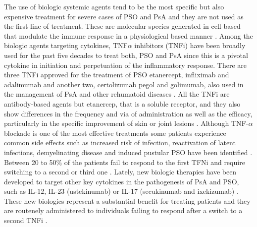 The use of biologic systemic agents tend to be the most specific but also expensive treatment for severe cases of PSO and PsA and they are not used as the first-line of treatment. These are molecular species generated in cell-based that modulate the immune response in a physiological based manner \parencite{Perera2012}. Among the biologic agents targeting cytokines, TNF$\alpha$ inhibitors (TNFi) have been broadly used for the past five decades to treat both, PSO and PsA since this is a pivotal cytokine in initiation and perpetuation of the inflammatory response. There are three TNFi approved for the treatment of PSO etanercept, infliximab and adalimumab \parencite{Ahil2016} and another two, certolizumab pegol and golimumab, also used in the management of PsA and other rehumatoid diseases  \parencite{Coates2016b}. All the TNFi are antibody-based agents but etanercep, that is a soluble receptor, and they also show differences in the frequency and via of administration as well as the efficacy, particularly in the specific improvement of skin or joint lesions \parencite{Mease2000}. Although TNF-$\alpha$ blockade is one of the most effective treatments some patients experience common side effects such as increased risk of infection, reactivation of latent infections, demyelinating disease and induced pustular PSO have been identified \parencite{Nickoloff2004}. Between 20 to 50\% of the patients fail to respond to the first TFNi and require switching to a second or third one \parencite{Abramson2016}. Lately, new biologic therapies have been developed to target other key cytokines in the pathogenesis of PsA and PSO, such as IL-12, IL-23 (ustekinumab) or  IL-17 (secukinumab and ixekizumab) \parencite{Mahil2016}. These new biologics represent a substantial benefit for treating patients and they are routenely administered to individuals failing to respond after a switch to a second TNFi \parencite{Coates2016b}.
 



